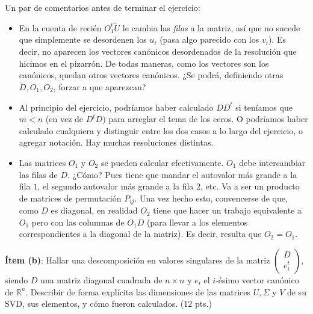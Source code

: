 \documentclass[10pt,a4paper,final]{article}
\begin{document}
Un par de comentarios antes de terminar el ejercicio:  

\begin{itemize}
    \item En la cuenta de recién $O_1^t \tilde{U}$ le cambia las \textit{filas} a la matriz, así que no sucede que simplemente se desordenen los $u_i$ (pasa algo parecido con los $v_i$). Es decir, no aparecen los vectores canónicos desordenados de la resolución que hicimos en el pizarrón. De todas maneras, como los vectores son los canónicos, quedan otros vectores canónicos. ¿Se podrá, definiendo otras $\tilde{D}, O_1, O_2$, forzar a que aparezcan?
    \item Al principio del ejercicio, podríamos haber calculado $D D^t$ si teníamos que $m<n$ (en vez de $D^t D)$ para arreglar el tema de los ceros. O podríamos haber calculado cualquiera y distinguir entre los dos casos a lo largo del ejercicio, o agregar notación. Hay muchas resoluciones distintas.
    \item Las matrices $O_1$ y $O_2$ se pueden calcular efectivamente. $O_1$ debe intercambiar las filas de $D$. ¿Cómo? Pues tiene que mandar el autovalor más grande a la fila $1$, el segundo autovalor más grande a la fila $2$, etc. Va a ser un producto de matrices de permutación $P_{ij}$. Una vez hecho esto, convencerse de que, como $D$ es diagonal, en realidad $O_2$ tiene que hacer un trabajo equivalente a $O_1$ pero con las columnas de $O_1 D$ (para llevar a los elementos correspondientes a la diagonal de la matriz). Es decir, resulta que $O_2 = O_1$. 
\end{itemize}




\bigskip\bigskip\bigskip\bigskip\bigskip



\textbf{ Ítem (b)}: Hallar una descomposici\'on en valores singulares de la matriz $\begin{pmatrix} D \\ e_i^t \end{pmatrix}$, siendo $D$ una matriz diagonal cuadrada de $n\times n$ y $e_i$ el $i$-\'esimo vector can\'onico de $\mathbb{R}^n$. Describir de forma expl\'icita las dimensiones de las matrices $U, \Sigma$ y $V$ de su SVD, sus elementos, y c\'omo fueron calculados. (12 pts.) \\
\end{document}
